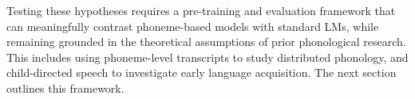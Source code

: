 Testing these hypotheses requires a pre-training and evaluation framework that can meaningfully contrast phoneme-based models with standard LMs, while remaining grounded in the theoretical assumptions of prior phonological research. This includes using phoneme-level transcripts to study distributed phonology, and child-directed speech to investigate early language acquisition. The next section outlines this framework.







